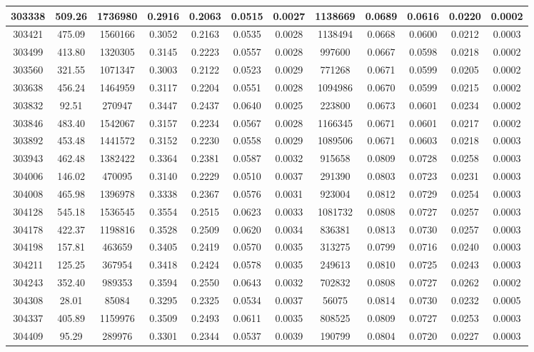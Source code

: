 \documentclass[10pt]{extarticle}
\begin{document}
\begin{longtable}{|c|c|c|c|c|c|c|c|c|c|c|c|}
\hline 
303338&509.26&1736980&0.2916&0.2063&0.0515&0.0027&1138669&0.0689&0.0616&0.0220&0.0002 \\ 
\hline 
303421&475.09&1560166&0.3052&0.2163&0.0535&0.0028&1138494&0.0668&0.0600&0.0212&0.0003 \\ 
\hline 
303499&413.80&1320305&0.3145&0.2223&0.0557&0.0028&997600&0.0667&0.0598&0.0218&0.0002 \\ 
\hline 
303560&321.55&1071347&0.3003&0.2122&0.0523&0.0029&771268&0.0671&0.0599&0.0205&0.0002 \\ 
\hline 
303638&456.24&1464959&0.3117&0.2204&0.0551&0.0028&1094986&0.0670&0.0599&0.0215&0.0002 \\ 
\hline 
303832&92.51&270947&0.3447&0.2437&0.0640&0.0025&223800&0.0673&0.0601&0.0234&0.0002 \\ 
\hline 
303846&483.40&1542067&0.3157&0.2234&0.0567&0.0028&1166345&0.0671&0.0601&0.0217&0.0002 \\ 
\hline 
303892&453.48&1441572&0.3152&0.2230&0.0558&0.0029&1089506&0.0671&0.0603&0.0218&0.0003 \\ 
\hline 
303943&462.48&1382422&0.3364&0.2381&0.0587&0.0032&915658&0.0809&0.0728&0.0258&0.0003 \\ 
\hline 
304006&146.02&470095&0.3140&0.2229&0.0510&0.0037&291390&0.0803&0.0723&0.0231&0.0003 \\ 
\hline 
304008&465.98&1396978&0.3338&0.2367&0.0576&0.0031&923004&0.0812&0.0729&0.0254&0.0003 \\ 
\hline 
304128&545.18&1536545&0.3554&0.2515&0.0623&0.0033&1081732&0.0808&0.0727&0.0257&0.0003 \\ 
\hline 
304178&422.37&1198816&0.3528&0.2509&0.0620&0.0034&836381&0.0813&0.0730&0.0257&0.0003 \\ 
\hline 
304198&157.81&463659&0.3405&0.2419&0.0570&0.0035&313275&0.0799&0.0716&0.0240&0.0003 \\ 
\hline 
304211&125.25&367954&0.3418&0.2424&0.0578&0.0035&249613&0.0810&0.0725&0.0243&0.0003 \\ 
\hline 
304243&352.40&989353&0.3594&0.2550&0.0643&0.0032&702832&0.0808&0.0727&0.0262&0.0002 \\ 
\hline 
304308&28.01&85084&0.3295&0.2325&0.0534&0.0037&56075&0.0814&0.0730&0.0232&0.0005 \\ 
\hline 
304337&405.89&1159976&0.3509&0.2493&0.0611&0.0035&808525&0.0809&0.0727&0.0253&0.0003 \\ 
\hline 
304409&95.29&289976&0.3301&0.2344&0.0537&0.0039&190799&0.0804&0.0720&0.0227&0.0003 \\ 
\hline 

\end{longtable}
\end{document}

